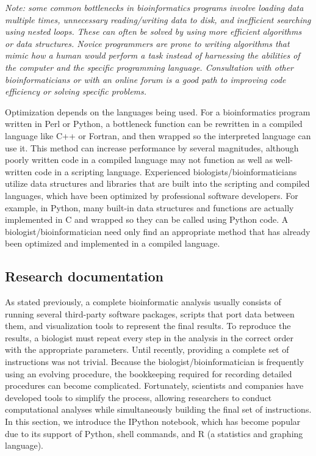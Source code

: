 \documentclass[ChapterTOCs,krantz2]{krantz} %
\begin{document}
\textsl{Note: some common bottlenecks in bioinformatics programs involve 
loading data multiple times, unnecessary reading/writing data to disk, 
and inefficient searching using nested loops.  These can often be solved 
by using more efficient algorithms or data structures.  
Novice programmers are prone to writing algorithms that 
mimic how a human would perform a task instead of 
harnessing the abilities of the computer 
and the specific programming language.  Consultation with other 
bioinformaticians or with an online forum is a good path to improving code efficiency 
or solving specific problems.}

Optimization depends on the
languages being used. For a bioinformatics program written in Perl or Python, a
bottleneck function can be rewritten in a compiled language like C++ or
Fortran, and then wrapped so the interpreted language can use it.  This method can increase performance by several magnitudes,
although poorly written code in a compiled language may not function as well as
well-written code in a scripting language.  Experienced
biologists/bioinformaticians utilize data structures and libraries that are
built into the scripting and compiled languages, which have been optimized by
professional software developers.  For example, in Python, many built-in data
structures and functions are actually implemented in C and wrapped so
they can be called using Python code.  A biologist/bioinformatician need only 
find an appropriate method that has already
been optimized and implemented in a compiled language.  

\subsection{Research documentation}

As stated previously, a complete bioinformatic analysis usually
consists of running several third-party software packages, scripts that port
data between them, and visualization tools to represent the final
results.  To reproduce the results, a biologist must
repeat every step in the analysis in the correct order with the appropriate
parameters. Until recently, providing a
complete set of instructions was not trivial.
Because the biologist/bioinformatician is frequently using an evolving
procedure, the bookkeeping required for recording detailed procedures
can become complicated.
Fortunately, scientists and companies have developed tools to simplify
the process, allowing researchers to conduct computational analyses while
simultaneously building the final set of instructions. 
In this section, we introduce the IPython notebook, which has become
popular due to its support of Python, shell commands, and R (a
statistics and graphing language). 
 
\end{document}
